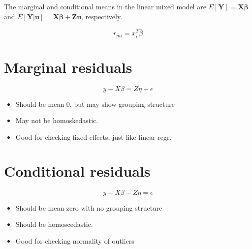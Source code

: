 \documentclass[12pt, a4paper]{report}
\theoremstyle{plain}
\theoremstyle{definition}
\theoremstyle{remark}
\begin{document}
	The marginal and conditional means in the linear mixed model are
	$E[\boldsymbol{Y}] = \boldsymbol{X}\boldsymbol{\beta}$ and
	$E[\boldsymbol{Y|\boldsymbol{u}}] = \boldsymbol{X}\boldsymbol{\beta} + \boldsymbol{Z}\boldsymbol{u}$, respectively.
	
	
	\begin{equation}
	r_{mi}=x^{T}_{i}\hat{\beta}
	\end{equation}
	
	\section{Marginal residuals}
	
	\[y - X\beta = Z \eta +\epsilon \]
	\begin{itemize}
		\item
		Should be mean 0, but may show grouping structure
		\item
		May not be homoskedastic.
		\item
		Good for checking fixed effects, just like linear regr.
	\end{itemize}
	\section{Conditional residuals}
	\[y - X\beta - Z \eta = \epsilon \]
	\begin{itemize}
		\item
		Should be mean zero with no grouping structure
		\item
		Should be homoscedastic.
		\item
		Good for checking normality of outliers
	\end{itemize}
	
	
	
	\newpage
\end{document}
